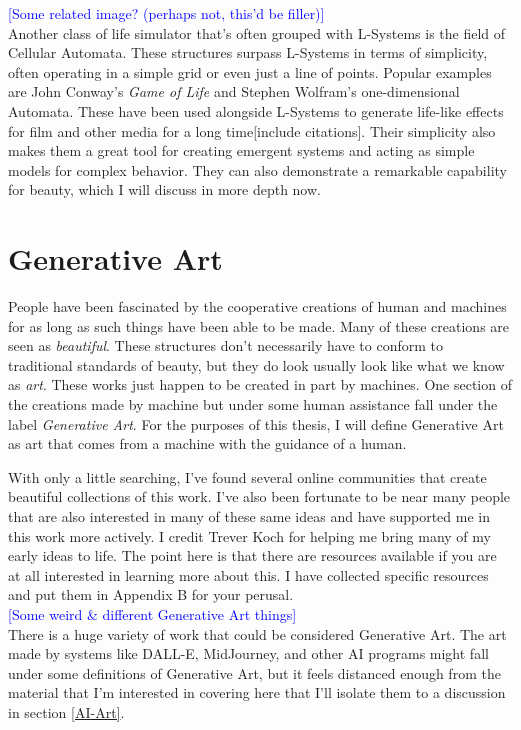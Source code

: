 \documentclass[12pt,twoside]{reedthesis}
\begin{document}
	\textcolor{blue}{[Some related image? (perhaps not, this'd be filler)]}\\
	
	Another class of life simulator that's often grouped with L-Systems is the field of Cellular Automata. These structures surpass L-Systems in terms of simplicity, often operating in a simple grid or even just a line of points. Popular examples are John Conway's \textit{Game of Life} and Stephen Wolfram's one-dimensional Automata. These have been used alongside L-Systems to generate life-like effects for film and other media for a long time[include citations]. Their simplicity also makes them a great tool for creating emergent systems and acting as simple models for complex behavior. They can also demonstrate a remarkable capability for beauty, which I will discuss in more depth now.

\section{Generative Art}

	People have been fascinated by the cooperative creations of human and machines for as long as such things have been able to be made. Many of these creations are seen as \textit{beautiful}. These structures don't necessarily have to conform to traditional standards of beauty, but they do look usually look like what we know as \textit{art}. These works just happen to be created in part by machines. One section of the creations made by machine but under some human assistance fall under the label \textit{Generative Art}. For the purposes of this thesis, I will define Generative Art as art that comes from a machine with the guidance of a human.
	
	With only a little searching, I've found several online communities that create beautiful collections of this work. I've also been fortunate to be near many people that are also interested in many of these same ideas and have supported me in this work more actively. I credit Trever Koch for helping me bring many of my early ideas to life. The point here is that there are resources available if you are at all interested in learning more about this. I have collected specific resources and put them in Appendix B for your perusal.\\
	
	\textcolor{blue}{[Some weird \& different Generative Art things]}\\
	
	There is a huge variety of work that could be considered Generative Art. The art made by systems like DALL-E, MidJourney, and other AI programs might fall under some definitions of Generative Art, but it feels distanced enough from the material that I'm interested in covering here that I'll isolate them to a discussion in section \ref{AI-Art}.\\
	
\end{document}
